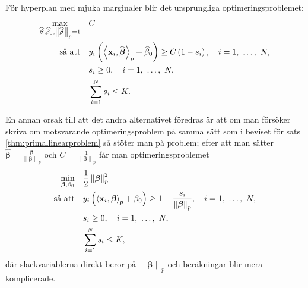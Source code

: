 \documentclass[a4paper, 12pt]{report}
\theoremstyle{definition}
\theoremstyle{remark}
\newcommand{\bfbeta}{{\boldsymbol{\beta}}}
\newcommand{\bfx}{\mathbf{x}}
\newcommand{\llangle}{\left\langle}
\newcommand{\rrangle}{\right\rangle}
\newcommand{\inner}[2]{\llangle #1, #2 \rrangle}
\begin{document}
För hyperplan med mjuka marginaler blir det ursprungliga optimeringsproblemet:
\begin{equation}\label{opt:softmargin}
\begin{aligned}
\operatornamewithlimits{max}_{\widehat{\bfbeta}, \widehat{\beta}_0, \left\|\widehat{\bfbeta}
\right\|_p=1}& & &C\\
\text{så att}& & &y_i\left(\inner{\bfx_i}{\widehat{\bfbeta}}_p+\widehat{\beta}_0\right)\geq C\left(1-s_i\right),\quad i=1,~\dots,~N,\\
& & &s_i\geq0,\quad i=1,~\dots,~N,\\
& & &\sum_{i=1}^{N}s_i \leq K.
\end{aligned}
\end{equation}

En annan orsak till att det andra alternativet föredras är att om man försöker skriva om motsvarande optimeringsproblem på samma sätt som i beviset för sats \ref{thm:primallinearproblem} så stöter man på problem; efter att man sätter $\widehat{\bfbeta}=\frac{\bfbeta}{\left\|\bfbeta
\right\|_p}$ och $C=\frac{1}{\left\|\bfbeta
\right\|_p}$ får man optimeringsproblemet
\begin{equation*}
\begin{aligned}
\operatornamewithlimits{min}_{\bfbeta, \beta_0} & & &\frac{1}{2}\left\|\bfbeta
\right\|_p^2\\
\text{så att} & & &y_i\left(\inner{\bfx_i}{\bfbeta}_p+\beta_0\right)\geq 1 - \frac{s_i}{\left\|\bfbeta\right\|_p},\quad i=1,~\dots,~N,\\
& & &s_i\geq0,\quad i=1,~\dots,~N,\\
& & &\sum_{i=1}^{N} s_i \leq K,
\end{aligned}
\end{equation*}
där slackvariablerna direkt beror på $\left\|\bfbeta\right\|_p$ och beräkningar blir mera komplicerade.
\end{document}
